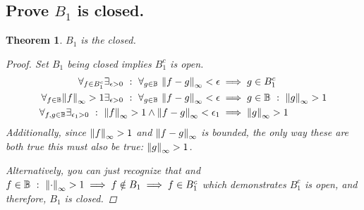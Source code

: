 \documentclass[]{article}
\newcommand{\st}{\ : \ }
\newtheorem{theorem}{Theorem}
\begin{document}
\subsection{Prove $B_1$ is closed.}
\begin{theorem}
    $B_1$ is the closed.
    \begin{proof}
        Set $B_1$ being closed implies $B_1^c$ is open.
        \begin{align*}
            \forall_{f \in B_1^c} \exists_{\epsilon>0} \st \forall_{g \in \mathbb{B}} \ \norm{f-g}_\infty < \epsilon &\implies g \in B_1^c\\
            \forall_{f \in \mathbb{B}} \norm{f}_\infty > 1 \exists_{\epsilon>0}\st \forall_{g \in \mathbb{B}} \ \norm{f-g}_\infty < \epsilon &\implies g \in \mathbb{B} \st \norm{g}_\infty > 1\\
            \forall_{f, g \in \mathbb{B}} \exists_{\epsilon_1>0} \st \norm{f}_\infty > 1 \land  \norm{f-g}_\infty < \epsilon_1 &\implies \norm{g}_\infty > 1
        \end{align*}
        Additionally, since $\norm{f}_\infty > 1$ and $\norm{f-g}_\infty$ is bounded, the only way these are both true this must also be true: $\norm{g}_\infty > 1$.

        Alternatively, you can just recognize that and $f \in \mathbb{B}\st \norm{\cdot}_\infty > 1 \implies f \notin B_1 \implies f \in B_1^c$ which demonstrates $B_1^c$ is open, and therefore, $B_1$ is closed.
    \end{proof}    
\end{theorem}

\end{document}
